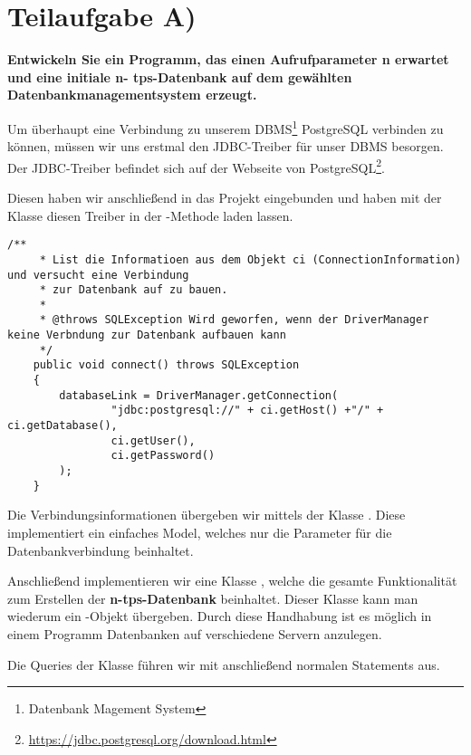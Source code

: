 \section{Teilaufgabe A)}
\textbf{Entwickeln Sie ein Programm, das einen Aufrufparameter n erwartet und eine initiale n-
tps-Datenbank auf dem gewählten Datenbankmanagementsystem erzeugt.}

Um überhaupt eine Verbindung zu unserem DBMS\footnote{Datenbank Magement
System} PostgreSQL verbinden zu können, müssen wir uns erstmal den JDBC-Treiber
für unser DBMS besorgen. Der JDBC-Treiber befindet sich auf der
Webseite von PostgreSQL\footnote{\url{https://jdbc.postgresql.org/download.html}}.

Diesen haben wir anschließend in das Projekt eingebunden und haben mit der
Klasse  diesen Treiber in der
-Methode laden lassen.

\begin{lstlisting}[caption={connect Funktion}]
	/**
	 * List die Informatioen aus dem Objekt ci (ConnectionInformation) und versucht eine Verbindung 
	 * zur Datenbank auf zu bauen.
	 * 
	 * @throws SQLException Wird geworfen, wenn der DriverManager keine Verbndung zur Datenbank aufbauen kann
	 */
	public void connect() throws SQLException
	{
		databaseLink = DriverManager.getConnection(
				"jdbc:postgresql://" + ci.getHost() +"/" + ci.getDatabase(),
				ci.getUser(), 
				ci.getPassword()
		);
	}
\end{lstlisting}

Die Verbindungsinformationen übergeben wir mittels der Klasse
. Diese implementiert ein einfaches Model, welches
nur die Parameter für die Datenbankverbindung beinhaltet.

Anschließend implementieren wir eine Klasse ,
welche die gesamte Funktionalität zum Erstellen der \textbf{n-tps-Datenbank} beinhaltet.
Dieser Klasse kann man wiederum ein -Objekt
übergeben. Durch diese Handhabung ist es möglich in einem Programm
Datenbanken auf verschiedene Servern anzulegen. 

Die Queries der Klasse 
führen wir mit anschließend normalen Statements aus. 

